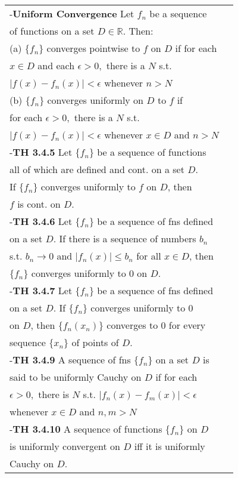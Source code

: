 \documentclass[10 pt,landscape]{article}
\begin{document}
\begin{multicols}{4}
\begin{tabular}{@{}ll@{}}



-\textbf{Uniform Convergence} Let $f_n$ be a sequence\\ of functions on a set $D \in \mathbb{R}$. Then: \\
(a) $\{f_n\}$ converges pointwise to $f$ on $D$ if for each \\$x \in D$ and each $\epsilon >0,$ there is a $N$ s.t.\\
$|f(x)-f_n(x)|< \epsilon $ whenever $ n>N$\\
(b) $\{f_n\}$ converges uniformly on $D$ to $f$ if\\ for each $\epsilon >0,$ there is a $N$ s.t.\\
$|f(x)-f_n(x)|< \epsilon $ whenever $x\in D$ and $ n>N$\\
-\textbf{TH 3.4.5} Let $\{f_n\}$ be a sequence of functions\\ all of which are defined and cont. on a set $D$.\\ If $\{f_n\}$ converges uniformly to $f$ on $D$, then \\$f$ is cont. on $D$.\\
-\textbf{TH 3.4.6} Let $\{f_n\}$ be a sequence of fns defined\\ on a set $D$. If there is a sequence of numbers $b_n$\\ s.t. $b_n \rightarrow 0$ and $|f_n (x)| \leq b_n$ for all $x\in D$, then\\ $\{f_n\}$ converges uniformly to $0$ on $D$. \\
-\textbf{TH 3.4.7} Let $\{f_n\}$ be a sequence of fns defined\\ on a set $D$. If $\{f_n\}$ converges uniformly to 0 \\ on $D$, then $\{f_n(x_n)\}$ converges to 0 for every \\sequence $\{x_n\}$ of points of $D$.\\
-\textbf{TH 3.4.9} A sequence of fns $\{f_n\}$ on a set $D$ is\\ said to be  uniformly Cauchy on $D$ if for each\\ $\epsilon >0,$ there is $N$ s.t. $|f_n(x)-f_m(x)| < \epsilon$\\ whenever $x \in D$ and $n,m>N$\\
-\textbf{TH 3.4.10} A sequence of functions $\{f_n\}$ on $D$\\ is uniformly convergent on $D$ iff it is uniformly\\ Cauchy on $D$.\\

\end{tabular}
\end{multicols}
\end{document}
